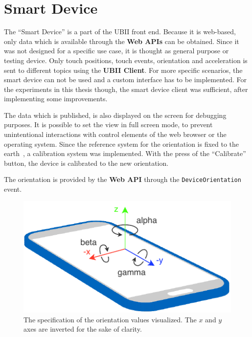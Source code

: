 \section{Smart Device}\label{section:smart-device}

The \enquote{Smart Device} is a part of the \ac{UBII} front end. Because it is web-based, only data which is available through the \textbf{Web \acp{API}} can be obtained. Since it was not designed for a specific use case, it is thought as general purpose or testing device. Only touch positions, touch events, orientation and acceleration is sent to different topics using the \textbf{\ac{UBII} Client}. For more specific scenarios, the smart device can not be used and a custom interface has to be implemented. For the experiments in this thesis though, the smart device client was sufficient, after implementing some improvements.

The data which is published, is also displayed on the screen for debugging purposes. It is possible to set the view in full screen mode, to prevent unintentional interactions with control elements of the web browser or the operating system. Since the reference system for the orientation is fixed to the earth~\cite[Chapter~4.1]{DevicesandSensorsWorkingGroup.2019}, a calibration system was implemented. With the press of the \enquote{Calibrate} button, the device is calibrated to the new orientation.

The orientation is provided by the \textbf{Web API} through the \lstinline{DeviceOrientation} event. %





\begin{figure}[htpb]
  \centering
  \includegraphics[width=12cm]{figures/webapi_device_orientation.pdf}
  \caption[Device Orientation]{The specification of the orientation values visualized. The $x$ and $y$ axes are inverted for the sake of clarity.}\label{fig:ubii_front_end}
\end{figure}


